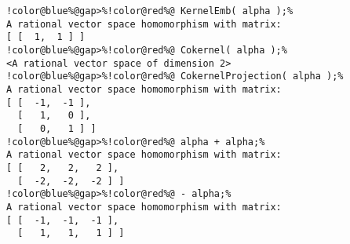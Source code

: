 \begin{Verbatim}[commandchars=!@\%,frame=single]
!color@blue%@gap>%!color@red%@ KernelEmb( alpha );%
A rational vector space homomorphism with matrix:
[ [  1,  1 ] ]
!color@blue%@gap>%!color@red%@ Cokernel( alpha );%
<A rational vector space of dimension 2>
!color@blue%@gap>%!color@red%@ CokernelProjection( alpha );%
A rational vector space homomorphism with matrix: 
[ [  -1,  -1 ],
  [   1,   0 ],
  [   0,   1 ] ]
!color@blue%@gap>%!color@red%@ alpha + alpha;%
A rational vector space homomorphism with matrix: 
[ [   2,   2,   2 ],
  [  -2,  -2,  -2 ] ]
!color@blue%@gap>%!color@red%@ - alpha;%
A rational vector space homomorphism with matrix: 
[ [  -1,  -1,  -1 ],
  [   1,   1,   1 ] ]
\end{Verbatim}
